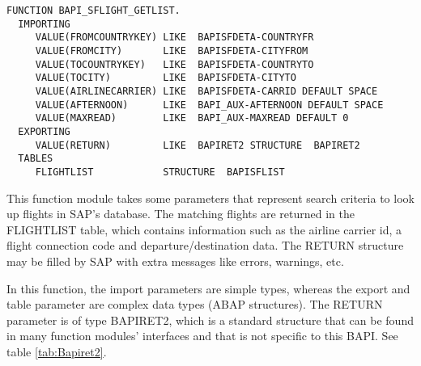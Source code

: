 \begin{lstlisting}[language={[R/3 6.10]ABAP},caption=The ABAP Function]
FUNCTION BAPI_SFLIGHT_GETLIST.
  IMPORTING
     VALUE(FROMCOUNTRYKEY) LIKE  BAPISFDETA-COUNTRYFR
     VALUE(FROMCITY)       LIKE  BAPISFDETA-CITYFROM
     VALUE(TOCOUNTRYKEY)   LIKE  BAPISFDETA-COUNTRYTO
     VALUE(TOCITY)         LIKE  BAPISFDETA-CITYTO
     VALUE(AIRLINECARRIER) LIKE  BAPISFDETA-CARRID DEFAULT SPACE
     VALUE(AFTERNOON)      LIKE  BAPI_AUX-AFTERNOON DEFAULT SPACE
     VALUE(MAXREAD)        LIKE  BAPI_AUX-MAXREAD DEFAULT 0
  EXPORTING
     VALUE(RETURN)         LIKE  BAPIRET2 STRUCTURE  BAPIRET2
  TABLES
     FLIGHTLIST            STRUCTURE  BAPISFLIST
\end{lstlisting}

This function module takes some parameters that represent search criteria to look up flights in SAP's database.
The matching flights are returned in the FLIGHTLIST table, which contains information such as
the airline carrier id, a flight connection code and departure/destination data.
The RETURN structure may be filled by SAP with extra messages like errors, warnings, etc.

In this function, the import parameters are simple types, whereas the export and table parameter are complex data types (ABAP structures).
The RETURN parameter is of type BAPIRET2, which is a standard structure that can be found in many function modules'
interfaces and that is not specific to this BAPI. See table \ref{tab:Bapiret2}.

